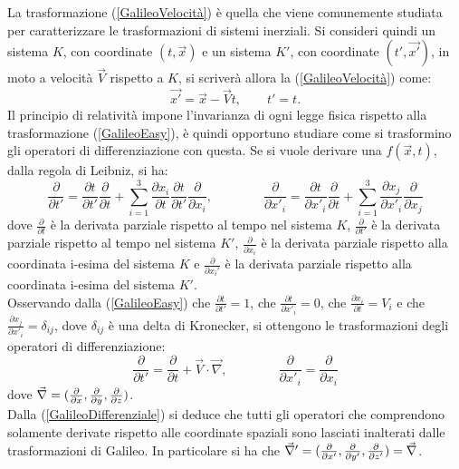 La trasformazione (\ref{GalileoVelocità}) è quella che viene comunemente studiata per caratterizzare le trasformazioni di sistemi inerziali. 
Si consideri quindi un sistema $K$, con coordinate $(t,\vec{x})$ e un sistema $K'$, con 
coordinate $(t',\vec{x'})$, in moto a velocità $\vec{V}$ rispetto a $K$, si scriverà allora la 
(\ref{GalileoVelocità}) come:
\begin{equation}
	\vec{x'}=\vec{x}-\vec{V}t, \qquad t'=t.
	\label{GalileoEasy}
\end{equation}
Il principio di relatività impone l'invarianza di ogni legge fisica rispetto alla trasformazione (\ref{GalileoEasy}), è quindi opportuno
studiare come si trasformino gli operatori di differenziazione con questa.
Se si vuole derivare una $f(\vec{x},t)$, dalla regola di Leibniz, si ha:
\begin{equation*}
		\frac{\partial}{\partial t'}=\frac{\partial t}{\partial t'}\frac{\partial}{\partial t}+
		\sum_{i=1}^{3}\frac{\partial x_i}{\partial t}\frac{\partial t}{\partial t'}
		\frac{\partial}{\partial x_i}, \qquad \qquad
		\frac{\partial}{\partial x'_i}=\frac{\partial t}{\partial x'_i}\frac{\partial}{\partial t}+
		\sum_{i=1}^{3}\frac{\partial x_j}{\partial x'_i}\frac{\partial}{\partial x_j}
\end{equation*}
dove $\frac{\partial}{\partial t}$ è la derivata parziale rispetto al tempo nel sistema $K$, $\frac{\partial}{\partial t'}$ è la derivata parziale rispetto al tempo nel sistema $K'$, $\frac{\partial}{\partial x_i}$ è la derivata parziale rispetto alla coordinata i-esima del sistema $K$ e $\frac{\partial}{\partial x_i'}$ è la derivata parziale rispetto alla coordinata i-esima del sistema $K'$.\\Osservando dalla (\ref{GalileoEasy}) che $\frac{\partial t}{\partial t'}=1$, che 
$\frac{\partial t}{\partial x'_i}=0$, che $\frac{\partial x_i}{\partial t}=V_i$ e che 
$\frac{\partial x_j}{\partial x'_i}=\delta_{ij}$, dove $\delta_{ij}$ è una delta di Kronecker, 
si ottengono le trasformazioni degli operatori di differenziazione:
\begin{equation}
	\frac{\partial}{\partial t'}=\frac{\partial}{\partial t}+\vec{V}\cdot\vec{\nabla}, \qquad \qquad
	\frac{\partial}{\partial x'_i}=\frac{\partial}{\partial x_i}
	\label{GalileoDifferenziale}
\end{equation}
dove $\vec{\nabla}=(\frac{\partial }{\partial x},\frac{\partial }{\partial y},\frac{\partial }{\partial z})$.\\
Dalla (\ref{GalileoDifferenziale}) si deduce che tutti gli operatori che comprendono solamente derivate 
rispetto alle coordinate spaziali sono lasciati inalterati dalle trasformazioni di Galileo. In particolare si ha che $\vec{\nabla}'=(\frac{\partial }{\partial x'},\frac{\partial }{\partial y'},\frac{\partial }{\partial z'})=\vec{\nabla}$.\\

